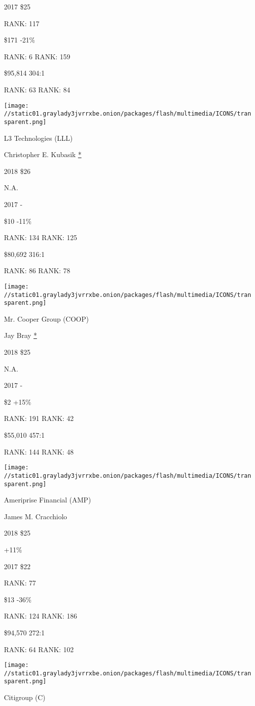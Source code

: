 2017 \$25

RANK: 117

 \$171 -21\%

RANK: 6 RANK: 159

 \$95,814 304:1

RANK: 63 RANK: 84

\texttt{[image: //static01.graylady3jvrrxbe.onion/packages/flash/multimedia/ICONS/transparent.png]}

L3 Technologies (LLL)

Christopher E. Kubasik \protect\hyperlink{g-footnotes}{*}

2018 \$26

 N.A.

2017 -

 \$10 -11\%

RANK: 134 RANK: 125

 \$80,692 316:1

RANK: 86 RANK: 78

\texttt{[image: //static01.graylady3jvrrxbe.onion/packages/flash/multimedia/ICONS/transparent.png]}

Mr. Cooper Group (COOP)

Jay Bray \protect\hyperlink{g-footnotes}{*}

2018 \$25

 N.A.

2017 -

 \$2 +15\%

RANK: 191 RANK: 42

 \$55,010 457:1

RANK: 144 RANK: 48

\texttt{[image: //static01.graylady3jvrrxbe.onion/packages/flash/multimedia/ICONS/transparent.png]}

Ameriprise Financial (AMP)

James M. Cracchiolo \protect\hyperlink{g-footnotes}{}

2018 \$25

 +11\%

2017 \$22

RANK: 77

 \$13 -36\%

RANK: 124 RANK: 186

 \$94,570 272:1

RANK: 64 RANK: 102

\texttt{[image: //static01.graylady3jvrrxbe.onion/packages/flash/multimedia/ICONS/transparent.png]}

Citigroup (C)

